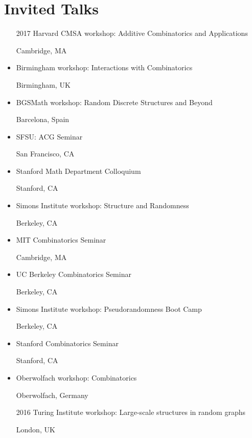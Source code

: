 \documentclass[11pt]{amsart}
\newcommand{\rightloc}[1]{\hfill {\raggedright #1}}
\begin{document}
\section*{Invited Talks}

\begin{itemize}[leftmargin=.4in,itemsep=5pt,topsep=0pt,label={}]

\item[2017] Harvard CMSA workshop: Additive Combinatorics and Applications \rightloc{Cambridge, MA}

\item Birmingham workshop: Interactions with Combinatorics \rightloc{Birmingham, UK}

\item BGSMath workshop: Random Discrete Structures and Beyond \rightloc{Barcelona, Spain}

\item SFSU: ACG Seminar \rightloc{San Francisco, CA}

\item Stanford Math Department Colloquium \rightloc{Stanford, CA}

\item Simons Institute workshop: Structure and Randomness \rightloc{Berkeley, CA}

\item MIT Combinatorics Seminar \rightloc{Cambridge, MA}
  
\item UC Berkeley Combinatorics Seminar
\rightloc{Berkeley, CA}

\item Simons Institute workshop: Pseudorandomness Boot Camp \rightloc{Berkeley, CA}

\item Stanford Combinatorics Seminar
\rightloc{Stanford, CA}

\item Oberwolfach workshop: Combinatorics \rightloc{Oberwolfach, Germany}

\item[2016] Turing Institute workshop: Large-scale structures in random graphs \rightloc{London, UK}


\end{itemize}
\end{document}
